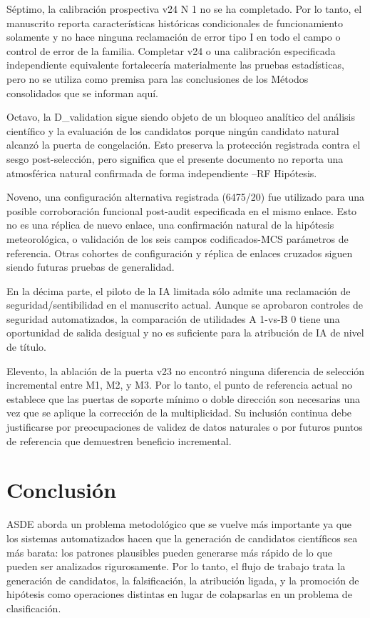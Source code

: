 \documentclass{ieeeaccess}
\begin{document}
Séptimo, la calibración prospectiva v24 N 1 no se ha completado. Por lo tanto, el manuscrito reporta características históricas condicionales de funcionamiento solamente y no hace ninguna reclamación de error tipo I en todo el campo o control de error de la familia. Completar v24 o una calibración especificada independiente equivalente fortalecería materialmente las pruebas estadísticas, pero no se utiliza como premisa para las conclusiones de los Métodos consolidados que se informan aquí.

Octavo, la D\_validation sigue siendo objeto de un bloqueo analítico del análisis científico y la evaluación de los candidatos porque ningún candidato natural alcanzó la puerta de congelación. Esto preserva la protección registrada contra el sesgo post-selección, pero significa que el presente documento no reporta una atmosférica natural confirmada de forma independiente --RF Hipótesis.

Noveno, una configuración alternativa registrada (6475/20) fue utilizado para una posible corroboración funcional post-audit especificada en el mismo enlace. Esto no es una réplica de nuevo enlace, una confirmación natural de la hipótesis meteorológica, o validación de los seis campos codificados-MCS parámetros de referencia. Otras cohortes de configuración y réplica de enlaces cruzados siguen siendo futuras pruebas de generalidad.

En la décima parte, el piloto de la IA limitada sólo admite una reclamación de seguridad/sentibilidad en el manuscrito actual. Aunque se aprobaron controles de seguridad automatizados, la comparación de utilidades A 1-vs-B 0 tiene una oportunidad de salida desigual y no es suficiente para la atribución de IA de nivel de título.

Elevento, la ablación de la puerta v23 no encontró ninguna diferencia de selección incremental entre M1, M2, y M3. Por lo tanto, el punto de referencia actual no establece que las puertas de soporte mínimo o doble dirección son necesarias una vez que se aplique la corrección de la multiplicidad. Su inclusión continua debe justificarse por preocupaciones de validez de datos naturales o por futuros puntos de referencia que demuestren beneficio incremental.

\section{Conclusión}\label{conclusiuxf3n}

ASDE aborda un problema metodológico que se vuelve más importante ya que los sistemas automatizados hacen que la generación de candidatos científicos sea más barata: los patrones plausibles pueden generarse más rápido de lo que pueden ser analizados rigurosamente. Por lo tanto, el flujo de trabajo trata la generación de candidatos, la falsificación, la atribución ligada, y la promoción de hipótesis como operaciones distintas en lugar de colapsarlas en un problema de clasificación.
\end{document}
